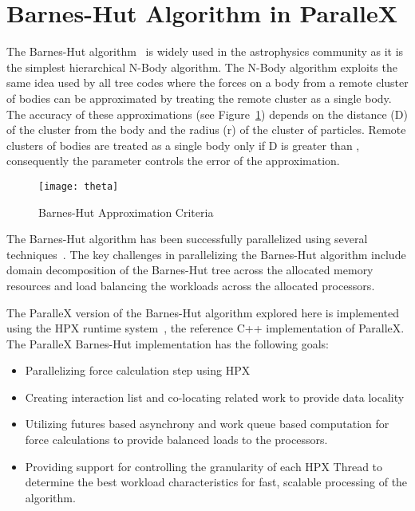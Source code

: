 \documentclass[floatfix]{revtex4}
\begin{document}
\section{Barnes-Hut Algorithm in ParalleX}
\label{barneshut}
The Barnes-Hut algorithm~\cite{barneshut} is widely used in
the astrophysics community as it is
the simplest hierarchical N-Body algorithm. The N-Body algorithm
exploits the same idea used by all tree codes where the forces on a
body from a remote cluster of bodies can be approximated by
treating the remote cluster as a single body. The accuracy of these
approximations (see Figure~\ref{thetafig}) depends on the distance (D) of the cluster from the body
and the radius (r) of the cluster of particles. Remote clusters of bodies
are treated as a single body only if D is greater than , consequently
the parameter  controls the error of the approximation.

\begin{figure}[htp]
\centering
\texttt{[image: theta]}
\caption{Barnes-Hut Approximation Criteria}
\label{thetafig}
\end{figure}

The Barnes-Hut algorithm has been successfully parallelized using several 
techniques~\cite{warren, salmon_thesis, liu, psingh, dubinski, makino}. The key challenges in parallelizing
the Barnes-Hut algorithm include domain decomposition of the Barnes-Hut tree across the
allocated memory resources and load balancing the workloads across the allocated processors.

The ParalleX version of the Barnes-Hut algorithm explored here is implemented using 
the HPX runtime system~\cite{scaling_impaired_apps}, the reference C++ implementation of
ParalleX. The ParalleX Barnes-Hut implementation has the following goals:
\begin{itemize}
\item Parallelizing force calculation step using HPX
\item Creating interaction list and co-locating related work to provide data locality
\item Utilizing futures based asynchrony and work queue based computation for force calculations
to provide balanced loads to the processors.
\item Providing support for controlling the granularity of each HPX Thread to determine the best
workload characteristics for fast, scalable processing of the algorithm.
\end{itemize}
\end{document}
